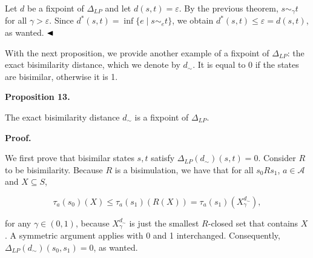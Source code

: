 \documentclass[10pt,a4paper]{article}
\begin{document}
 
Let $d$ be a fixpoint of $\Delta_{LP}$ and let $d(s,t)=\varepsilon$. By the previous theorem, $s\sim_{\gamma}t$ for all $\gamma>\varepsilon$. Since $d^{*}(s,t)=\inf\{e\mid s\sim_{e}t\}$, we obtain $d^{*}(s,t)\leq\varepsilon=d(s,t)$, as wanted. $\hfill\blacktriangleleft$\par
 
 
 
With the next proposition, we provide another example of a fixpoint of $\Delta_{LP}$: the exact bisimilarity distance, which we denote by $d_{\sim}$. It is equal to 0 if the states are bisimilar, otherwise it is 1.\par
 
 
 
\par\medskip\noindent\textbf{Proposition 13.}\par
 
 
The exact bisimilarity distance $d_{\sim}$ is a fixpoint of $\Delta_{LP}$.\par
 
 
 
 
 
\par\medskip\noindent\textbf{Proof.}\par
 
 
We first prove that bisimilar states $s,t$ satisfy $\Delta_{LP}(d_{\sim})(s,t)=0$. Consider $R$ to be bisimilarity. Because $R$ is a bisimulation, we have that for all $s_{0}Rs_{1}$, $a\in\mathcal{A}$ and $X\subseteq S$,\par
  
\par  \quad  \[\tau_{a}(s_{0})(X)\leq\tau_{a}(s_{1})(R(X))=\tau_{a}(s_{1})(X^{d_{\sim}}_{\gamma}),\]\quad  \quad  
  
for any $\gamma\in(0,1)$, because $X^{d_{\sim}}_{\gamma}$ is just the smallest $R$-closed set that contains $X$. A symmetric argument applies with 0 and 1 interchanged. Consequently, $\Delta_{LP}(d_{\sim})(s_{0},s_{1})=0$, as wanted.\par
 
\end{document}
